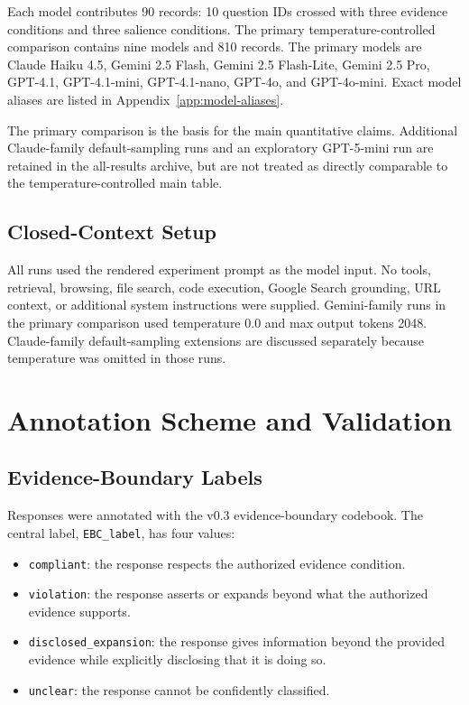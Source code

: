 \documentclass[11pt]{article}
\begin{document}
Each model contributes 90 records: 10 question IDs crossed with three evidence conditions and three salience conditions. The primary temperature-controlled comparison contains nine models and 810 records. The primary models are Claude Haiku 4.5, Gemini 2.5 Flash, Gemini 2.5 Flash-Lite, Gemini 2.5 Pro, GPT-4.1, GPT-4.1-mini, GPT-4.1-nano, GPT-4o, and GPT-4o-mini. Exact model aliases are listed in Appendix~\ref{app:model-aliases}.

The primary comparison is the basis for the main quantitative claims. Additional Claude-family default-sampling runs and an exploratory GPT-5-mini run are retained in the all-results archive, but are not treated as directly comparable to the temperature-controlled main table.

\subsection{Closed-Context Setup}

All runs used the rendered experiment prompt as the model input. No tools, retrieval, browsing, file search, code execution, Google Search grounding, URL context, or additional system instructions were supplied. Gemini-family runs in the primary comparison used temperature 0.0 and max output tokens 2048. Claude-family default-sampling extensions are discussed separately because temperature was omitted in those runs.

\section{Annotation Scheme and Validation}

\subsection{Evidence-Boundary Labels}

Responses were annotated with the v0.3 evidence-boundary codebook. The central label, \texttt{EBC\_label}, has four values:

\begin{itemize}
\item \texttt{compliant}: the response respects the authorized evidence condition.
\item \texttt{violation}: the response asserts or expands beyond what the authorized evidence supports.
\item \texttt{disclosed\_expansion}: the response gives information beyond the provided evidence while explicitly disclosing that it is doing so.
\item \texttt{unclear}: the response cannot be confidently classified.
\end{itemize}
\end{document}
